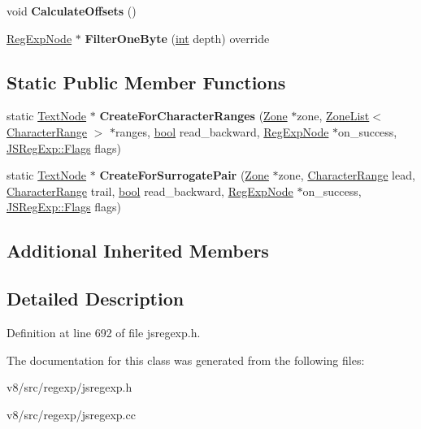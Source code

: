\begin{DoxyCompactItemize}
\item 
\mbox{\label{classv8_1_1internal_1_1TextNode_a12a59535555258c7ef5415d28e6bc152}} 
void {\bfseries Calculate\+Offsets} ()
\item 
\mbox{\label{classv8_1_1internal_1_1TextNode_acc999bc2e2b18f416895032b006d66e2}} 
\mbox{\hyperlink{classv8_1_1internal_1_1RegExpNode}{Reg\+Exp\+Node}} $\ast$ {\bfseries Filter\+One\+Byte} (\mbox{\hyperlink{classint}{int}} depth) override
\end{DoxyCompactItemize}
\subsection*{Static Public Member Functions}
\begin{DoxyCompactItemize}
\item 
\mbox{\label{classv8_1_1internal_1_1TextNode_a2e529a6a68a9ce43c24ae533bcaac1b2}} 
static \mbox{\hyperlink{classv8_1_1internal_1_1TextNode}{Text\+Node}} $\ast$ {\bfseries Create\+For\+Character\+Ranges} (\mbox{\hyperlink{classv8_1_1internal_1_1Zone}{Zone}} $\ast$zone, \mbox{\hyperlink{classv8_1_1internal_1_1ZoneList}{Zone\+List}}$<$ \mbox{\hyperlink{classv8_1_1internal_1_1CharacterRange}{Character\+Range}} $>$ $\ast$ranges, \mbox{\hyperlink{classbool}{bool}} read\+\_\+backward, \mbox{\hyperlink{classv8_1_1internal_1_1RegExpNode}{Reg\+Exp\+Node}} $\ast$on\+\_\+success, \mbox{\hyperlink{classv8_1_1base_1_1Flags}{J\+S\+Reg\+Exp\+::\+Flags}} flags)
\item 
\mbox{\label{classv8_1_1internal_1_1TextNode_a5750e4be821cb13123a6c94e935c70c9}} 
static \mbox{\hyperlink{classv8_1_1internal_1_1TextNode}{Text\+Node}} $\ast$ {\bfseries Create\+For\+Surrogate\+Pair} (\mbox{\hyperlink{classv8_1_1internal_1_1Zone}{Zone}} $\ast$zone, \mbox{\hyperlink{classv8_1_1internal_1_1CharacterRange}{Character\+Range}} lead, \mbox{\hyperlink{classv8_1_1internal_1_1CharacterRange}{Character\+Range}} trail, \mbox{\hyperlink{classbool}{bool}} read\+\_\+backward, \mbox{\hyperlink{classv8_1_1internal_1_1RegExpNode}{Reg\+Exp\+Node}} $\ast$on\+\_\+success, \mbox{\hyperlink{classv8_1_1base_1_1Flags}{J\+S\+Reg\+Exp\+::\+Flags}} flags)
\end{DoxyCompactItemize}
\subsection*{Additional Inherited Members}


\subsection{Detailed Description}


Definition at line 692 of file jsregexp.\+h.



The documentation for this class was generated from the following files\+:\begin{DoxyCompactItemize}
\item 
v8/src/regexp/jsregexp.\+h\item 
v8/src/regexp/jsregexp.\+cc\end{DoxyCompactItemize}
